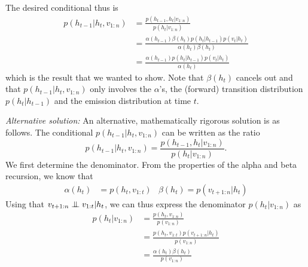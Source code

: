 \begin{exenumerate}
\begin{solution}
      The desired conditional thus is
      \begin{align}
        p(h_{t-1} | h_t, v_{1:n}) & = \frac{p(h_{t-1}, h_t| v_{1:n})}{p(h_t|v_{1:n})} \\
        & = \frac{\alpha(h_{t-1}) \beta(h_t) p(h_t|h_{t-1}) p(v_t|h_t)}{\alpha(h_t) \beta(h_t)}\\
        & = \frac{\alpha(h_{t-1}) p(h_t|h_{t-1}) p(v_t|h_t)}{\alpha(h_t)}
      \end{align}
      which is the result that we wanted to show. Note that
      $\beta(h_t)$ cancels out and that $p(h_{t-1} | h_t, v_{1:n})$
      only involves the $\alpha$'s, the (forward) transition
      distribution $p(h_t|h_{t-1})$ and the emission distribution at
      time $t$.

      \emph{Alternative solution:} An alternative, mathematically rigorous
      solution is as follows.  The conditional $p(h_{t-1}|h_t,
      v_{1:n})$ can be written as the ratio
      \begin{equation}
        p(h_{t-1}|h_t, v_{1:n}) = \frac{p(h_{t-1}, h_t| v_{1:n})}{p(h_t|v_{1:n})}.
      \end{equation}
      We first determine the denominator. From the properties of the
      alpha and beta recursion, we know that
      \begin{align}
        \alpha(h_{t}) &= p(h_{t}, v_{1:t}) & \beta(h_t) = p(v_{t+1:n}|h_t)
      \end{align}
      Using that $v_{t+1:n} \mathrel{\perp\mspace{-10mu}\perp} v_{1:t} | h_t$, we can thus
      express the denominator $p(h_t|v_{1:n})$ as
      \begin{align}
        p(h_t|v_{1:n}) &= \frac{p(h_t, v_{1:n})}{p(v_{1:n})}\\
        & = \frac{p(h_t, v_{1:t}) p(v_{t+1:n}|h_t)}{p(v_{1:n})}\\
        & = \frac{\alpha(h_t) \beta(h_t)}{p(v_{1:n})}
      \end{align}
      

\end{solution}
\end{exenumerate}
